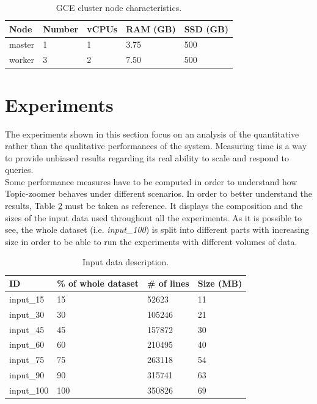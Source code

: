 \documentclass{sig-alternate-05-2015}
\begin{document}
\begin{table}[]
    \centering
    \caption{GCE cluster node characteristics.}
    \label{cluster}
    \begin{tabular}{lllll}
    \hline
    Node   & Number & vCPUs & RAM (GB) & SSD (GB) \\
    \hline
    master & 1      & 1     & 3.75     & 500      \\
    worker & 3      & 2     & 7.50     & 500     
    \end{tabular}
\end{table}


\section{Experiments}\label{experiments}
The experiments shown in this section focus on an analysis of the quantitative rather than the qualitative performances of the system. Measuring time is a way to provide unbiased results regarding its real ability to scale and respond to queries.\\
Some performance measures have to be computed in order to understand how Topic-zoomer behaves under different scenarios. In order to better understand the results, Table \ref{datasets} must be taken as reference. It displays the composition and the sizes of the input data used throughout all the experiments. As it is possible to see, the whole dataset (i.e. \emph{input\_100}) is split into different parts with increasing size in order to be able to run the experiments with different volumes of data.

\begin{table}[]
    \centering
    \caption{Input data description.}
    \label{datasets}
    \begin{tabular}{llll}
    \hline
    ID         & \% of whole dataset & \# of lines & Size (MB) \\
    \hline
    input\_15  & 15                  & 52623       & 11        \\
    input\_30  & 30                  & 105246      & 21        \\
    input\_45  & 45                  & 157872      & 30        \\
    input\_60  & 60                  & 210495      & 40        \\
    input\_75  & 75                  & 263118      & 54        \\
    input\_90  & 90                  & 315741      & 63        \\
    input\_100 & 100                 & 350826      & 69       
    \end{tabular}
\end{table}
\end{document}
